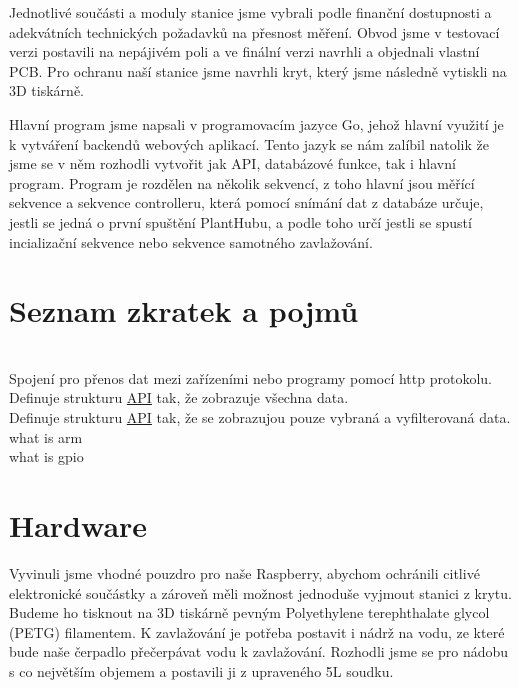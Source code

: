 \documentclass[12pt,a4paper]{article}
\begin{document}
Jednotlivé součásti a moduly stanice jsme vybrali podle finanční dostupnosti a adekvátních technických požadavků na přesnost měření. Obvod jsme v testovací verzi postavili na nepájivém poli a ve finální verzi navrhli a objednali vlastní \ac{PCB}. Pro ochranu naší stanice jsme navrhli kryt, který jsme následně vytiskli na 3D tiskárně.

Hlavní program jsme napsali v programovacím jazyce Go, jehož hlavní využití je k vytváření backendů webových aplikací. Tento jazyk se nám zalíbil natolik že jsme se v něm rozhodli vytvořit jak \ac{API}, databázové funkce, tak i hlavní program. Program je rozdělen na několik sekvencí, z toho hlavní jsou měřící sekvence a sekvence controlleru, která pomocí snímání dat z databáze určuje, jestli se jedná o první spuštění PlantHubu, a podle toho určí jestli se spustí incializační sekvence nebo sekvence samotného zavlažování.

\clearpage

\section{Seznam zkratek a pojmů}
\begin{acronym}
	 \\
		Spojení pro přenos dat mezi zařízeními nebo programy pomocí http protokolu.
	 \\
		Definuje strukturu \underline{\ac{API}} tak, že zobrazuje všechna data.
	 \\
		Definuje strukturu \underline{\ac{API}} tak, že se zobrazujou pouze vybraná a vyfilterovaná data. 
	 \\ 
		what is arm
	 \\ 
		what is gpio
\end{acronym}

\clearpage

\section{Hardware}

Vyvinuli jsme vhodné pouzdro pro naše Raspberry, abychom ochránili citlivé elektronické součástky a zároveň měli možnost jednoduše vyjmout stanici z krytu. Budeme ho tisknout na 3D tiskárně pevným Polyethylene terephthalate glycol (PETG) filamentem. K zavlažování je potřeba postavit i nádrž na vodu, ze které bude naše čerpadlo přečerpávat vodu k zavlažování. Rozhodli jsme se pro nádobu s co největším objemem a postavili ji z upraveného 5L soudku.
\end{document}
